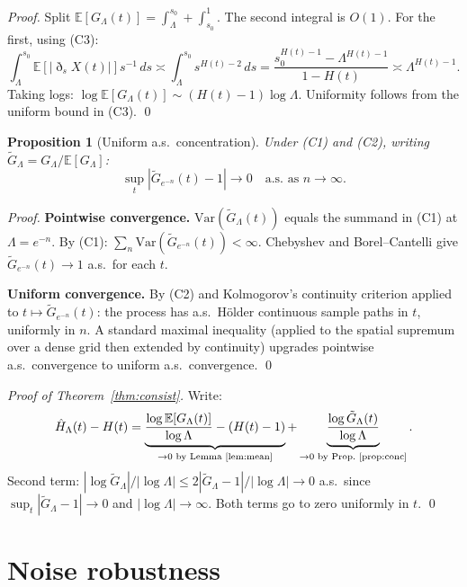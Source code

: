 \documentclass[11pt,a4paper]{article}
\newtheorem{proposition}[theorem]{Proposition}
\theoremstyle{definition}
\theoremstyle{remark}
\newcommand{\E}{\mathbb{E}}
\newcommand{\GL}{G_\Lambda}
\newcommand{\Hhat}{\hat{H}_\Lambda}
\begin{document}
\begin{proof}
Split $\E[\GL(t)]=\int_\Lambda^{s_0}+\int_{s_0}^1$. The second
integral is $O(1)$. For the first, using (C3):
\[
  \int_\Lambda^{s_0}\E[|\eth_s X(t)|]s^{-1}\,ds
  \asymp\int_\Lambda^{s_0}s^{H(t)-2}\,ds
  =\frac{s_0^{H(t)-1}-\Lambda^{H(t)-1}}{1-H(t)}\asymp\Lambda^{H(t)-1}.
\]
Taking logs: $\log\E[\GL(t)]\sim(H(t)-1)\log\Lambda$.
Uniformity follows from the uniform bound in (C3). \qed
\end{proof}

\begin{proposition}[Uniform a.s.\ concentration]\label{prop:conc}
Under (C1) and (C2), writing $\tilde G_\Lambda=\GL/\E[\GL]$:
\[
  \sup_t|\tilde G_{e^{-n}}(t)-1|\to0\quad\text{a.s.\ as }n\to\infty.
\]
\end{proposition}

\begin{proof}
\textbf{Pointwise convergence.}
$\mathrm{Var}(\tilde G_\Lambda(t))$ equals the summand in (C1) at
$\Lambda=e^{-n}$. By (C1): $\sum_n\mathrm{Var}(\tilde G_{e^{-n}}(t))<\infty$.
Chebyshev and Borel--Cantelli give $\tilde G_{e^{-n}}(t)\to1$ a.s.\
for each $t$.

\textbf{Uniform convergence.}
By (C2) and Kolmogorov's continuity criterion applied to
$t\mapsto\tilde G_{e^{-n}}(t)$: the process has a.s.\ H\"{o}lder
continuous sample paths in $t$, uniformly in $n$. A standard
maximal inequality (applied to the spatial supremum over a dense grid
then extended by continuity) upgrades pointwise a.s.\ convergence to
uniform a.s.\ convergence. \qed
\end{proof}

\begin{proof}[Proof of Theorem~\ref{thm:consist}]
Write:
\[
  \Hhat(t)-H(t)
  = \underbrace{\frac{\log\E[\GL(t)]}{\log\Lambda}-(H(t)-1)}_{\to0\text{ by Lemma~\ref{lem:mean}}}
  +\underbrace{\frac{\log\tilde G_\Lambda(t)}{\log\Lambda}}_{\to0\text{ by Prop.~\ref{prop:conc}}}.
\]
Second term: $|\log\tilde G_\Lambda|/|\log\Lambda|\le
2|\tilde G_\Lambda-1|/|\log\Lambda|\to0$ a.s.\ since
$\sup_t|\tilde G_\Lambda-1|\to0$ and $|\log\Lambda|\to\infty$.
Both terms go to zero uniformly in $t$. \qed
\end{proof}

\section{Noise robustness}
\end{document}
